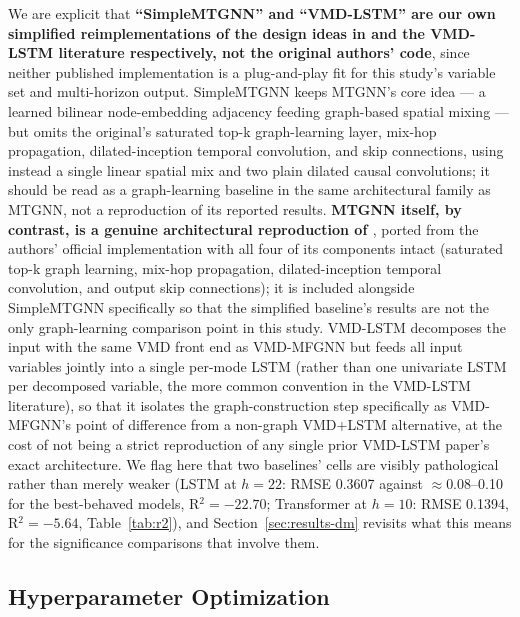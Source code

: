 \documentclass[journal]{IEEEtran}
\begin{document}
We are explicit that \textbf{``SimpleMTGNN'' and ``VMD-LSTM'' are our own simplified reimplementations of the design ideas in \citet{Wu2020mtgnn} and the VMD-LSTM literature respectively, not the original authors' code}, since neither published implementation is a plug-and-play fit for this study's variable set and multi-horizon output. SimpleMTGNN keeps MTGNN's core idea --- a learned bilinear node-embedding adjacency feeding graph-based spatial mixing --- but omits the original's saturated top-k graph-learning layer, mix-hop propagation, dilated-inception temporal convolution, and skip connections, using instead a single linear spatial mix and two plain dilated causal convolutions; it should be read as a graph-learning baseline in the same architectural family as MTGNN, not a reproduction of its reported results. \textbf{MTGNN itself, by contrast, is a genuine architectural reproduction of \citet{Wu2020mtgnn}}, ported from the authors' official implementation with all four of its components intact (saturated top-k graph learning, mix-hop propagation, dilated-inception temporal convolution, and output skip connections); it is included alongside SimpleMTGNN specifically so that the simplified baseline's results are not the only graph-learning comparison point in this study. VMD-LSTM decomposes the input with the same VMD front end as VMD-MFGNN but feeds all input variables jointly into a single per-mode LSTM (rather than one univariate LSTM per decomposed variable, the more common convention in the VMD-LSTM literature), so that it isolates the graph-construction step specifically as VMD-MFGNN's point of difference from a non-graph VMD+LSTM alternative, at the cost of not being a strict reproduction of any single prior VMD-LSTM paper's exact architecture. We flag here that two baselines' cells are visibly pathological rather than merely weaker (LSTM at $h=22$: RMSE 0.3607 against $\approx$0.08--0.10 for the best-behaved models, R$^2=-22.70$; Transformer at $h=10$: RMSE 0.1394, R$^2=-5.64$, Table~\ref{tab:r2}), and Section~\ref{sec:results-dm} revisits what this means for the significance comparisons that involve them.

\subsection{Hyperparameter Optimization}
\label{sec:hpo}
\end{document}
